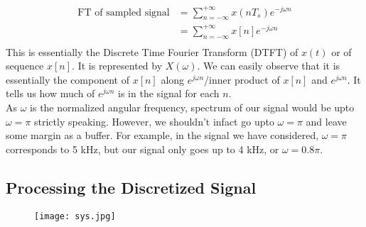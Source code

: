 \begin{align*}
\text{FT of sampled signal}&=\sum\limits_{n=-\infty}^{+\infty} x(nT_s)e^{-j\omega n}\\
&=\sum\limits_{n=-\infty}^{+\infty} x[n]e^{-j\omega n}\\
\end{align*}
This is essentially the Discrete Time Fourier Transform (DTFT) of $x(t)$ or of sequence $x[n]$. It is represented by $X(\omega)$. We can easily observe that it is essentially the component of $x[n]$ along $e^{j\omega n}$/inner product of $x[n]$ and  $e^{j\omega n}$. It tells us how much of $e^{j\omega n}$ is in the signal for each $n$.\\
As $\omega$ is the normalized angular frequency, spectrum of our signal would be upto $\omega=\pi$ strictly speaking. However, we shouldn't infact go upto $\omega=\pi$ and leave some margin as a buffer. For example, in the signal we have considered, $\omega=\pi$ corresponds to 5 kHz, but our signal only goes up to 4 kHz, or $\omega=0.8\pi$.
\subsection{Processing the Discretized Signal}

\begin{figure}[htb]
\centering
\texttt{[image: sys.jpg]}
\caption{\label{fig:fig6}}
\end{figure}

